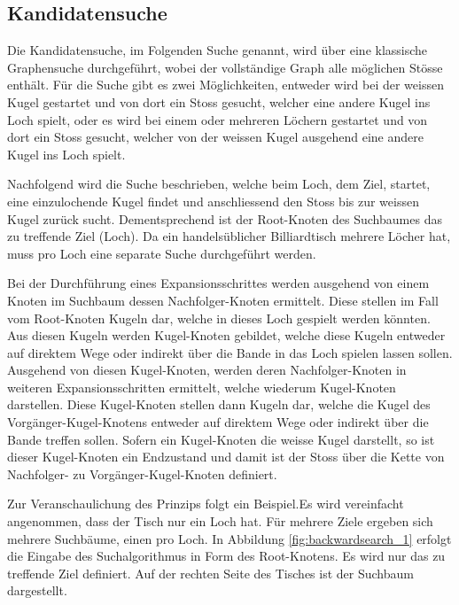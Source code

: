 \subsection{Kandidatensuche}\label{sec:kandidatensuche}
Die Kandidatensuche, im Folgenden Suche genannt, wird über eine klassische Graphensuche durchgeführt, wobei der vollständige
Graph alle möglichen Stösse enthält.
Für die Suche gibt es zwei Möglichkeiten, entweder wird bei der weissen Kugel gestartet und von dort ein Stoss gesucht,
welcher eine andere Kugel ins Loch spielt, oder es wird bei einem oder mehreren Löchern gestartet und von dort ein Stoss gesucht,
welcher von der weissen Kugel ausgehend eine andere Kugel ins Loch spielt.

Nachfolgend wird die Suche beschrieben, welche beim Loch, dem Ziel, startet, eine einzulochende Kugel findet
und anschliessend den Stoss bis zur weissen Kugel zurück sucht.
Dementsprechend ist der Root-Knoten des Suchbaumes das zu treffende Ziel (Loch).
Da ein handelsüblicher Billiardtisch mehrere Löcher hat, muss pro Loch eine separate Suche durchgeführt werden.

Bei der Durchführung eines Expansionsschrittes werden ausgehend von einem Knoten im Suchbaum dessen Nachfolger-Knoten ermittelt.
Diese stellen im Fall vom Root-Knoten Kugeln dar, welche in dieses Loch gespielt werden könnten.
Aus diesen Kugeln werden Kugel-Knoten gebildet, welche diese Kugeln entweder auf direktem Wege oder indirekt über die Bande
in das Loch spielen lassen sollen.
Ausgehend von diesen Kugel-Knoten, werden deren Nachfolger-Knoten in weiteren Expansionsschritten ermittelt, welche
wiederum Kugel-Knoten darstellen.
Diese Kugel-Knoten stellen dann Kugeln dar, welche die Kugel des Vorgänger-Kugel-Knotens entweder auf direktem Wege oder indirekt
über die Bande treffen sollen.
Sofern ein Kugel-Knoten die weisse Kugel darstellt, so ist dieser Kugel-Knoten ein Endzustand und damit ist der Stoss
über die Kette von Nachfolger- zu Vorgänger-Kugel-Knoten definiert.

Zur Veranschaulichung des Prinzips folgt ein Beispiel.Es wird vereinfacht angenommen,
dass der Tisch nur ein Loch hat. Für mehrere Ziele ergeben sich mehrere Suchbäume, einen pro Loch.
In Abbildung \ref{fig:backwardsearch_1} erfolgt die Eingabe des Suchalgorithmus in Form des Root-Knotens.
Es wird nur das zu treffende Ziel definiert. Auf der rechten Seite des Tisches ist der Suchbaum dargestellt.


